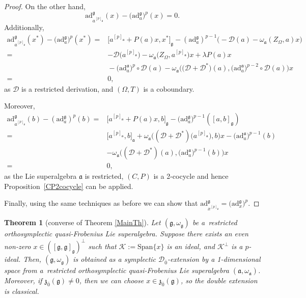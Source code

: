 \documentclass[pdftex]{sigma}
\numberwithin{equation}{section}
\newtheorem{Theorem}{Theorem}[section]
\begin{document}
\begin{proof}
On the other hand,
\[
\mathrm{ad}_{a^{[p]_\mathfrak{g}}}^\mathfrak{g}(x)-\big(\mathrm{ad}_{a}^\mathfrak{g}\big)^p(x) = 0.
\]
Additionally,
\begin{align*}
\mathrm{ad}_{a^{[p]_\mathfrak{g}}}^\mathfrak{g}(x^*)-\bigl(\mathrm{ad}_{a}^\mathfrak{g}\bigr)^p(x^*) ={}& \big[a^{[p]_\mathfrak{a}}+P(a)x, x^*\big]_\mathfrak{g}-(\mathrm{ad}_{a}^\mathfrak{g})^{p-1}\bigl(-\mathscr{D}(a)-\omega_\mathfrak{a}(Z_\Omega,a)x\bigr)\\
={}& -{\mathscr D}\bigl(a^{[p]_\mathfrak{a}}\bigr)-\omega_\mathfrak{a}\bigl(Z_\Omega, a^{[p]_\mathfrak{a}}\bigr)x+\lambda P(a)x\\
&{}-\bigl(\mathrm{ad}_a^\mathfrak{a}\bigr)^p\circ {\mathscr D}(a)-\omega_\mathfrak{a}\bigl(\bigl({\mathscr D}+{\mathscr D}^*\bigr)(a), \bigl(\mathrm{ad}_a^\mathfrak{a}\bigr)^{p-2}\circ {\mathscr D}(a)\bigr)x\\
={}&0,
\end{align*}
as ${\mathscr D}$ is a restricted derivation, and $(\Omega, T)$ is a coboundary.

Moreover,
\begin{align*}
\mathrm{ad}_{a^{[p]_\mathfrak{g}}}^\mathfrak{g}(b)-(\mathrm{ad}_{a}^\mathfrak{g})^p(b) ={}& \big[a^{[p]_\mathfrak{a}}+P(a)x,b\big]_\mathfrak{g}-\bigl(\mathrm{ad}_a^\mathfrak{g}\bigr)^{p-1}([a,b]_\mathfrak{g})\\
={}& \big[a^{[p]_\mathfrak{a}},b\big]_\mathfrak{a}+\omega_\mathfrak{a}\bigl(({\mathscr D}+{\mathscr D}^*)\bigl(a^{[p]_\mathfrak{a}}\bigr), b\bigr)x- \bigl(\mathrm{ad}_a^\mathfrak{a}\bigr)^{p-1}(b)\\
&-\omega_\mathfrak{a}\bigl(({\mathscr D}+{\mathscr D}^*)(a), \bigl(\mathrm{ad}_a^\mathfrak{a}\bigr)^{p-1}(b)\bigr)x\\
={}&0,
\end{align*}
as the Lie superalgebra $\mathfrak{a}$ is restricted, $(C,P)$ is a 2-cocycle and hence Proposition~\ref{CP2cocycle} can be applied.

Finally, using the same techniques as before we can show that $\mathrm{ad}_{x^{[p]_\mathfrak{g}}}^\mathfrak{g}=\big(\mathrm{ad}_x^\mathfrak{g}\big)^p$.
\end{proof}
\begin{Theorem}[converse of Theorem \ref{MainTh}]
\label{Rec1}
Let $(\mathfrak{g},\omega_\mathfrak{g})$ be a~restricted orthosymplectic quasi-Frobenius Lie superalgebra. Suppose there exists an even non-zero $x\in ([\mathfrak{g}, \mathfrak{g}]_\mathfrak{g})^\perp$ such that $\mathscr{K}:=\mathrm{Span}\{x\}$ is an ideal, and $\mathscr{K}^\perp$ is a $p$-ideal. Then, $(\mathfrak{g},\omega_\mathfrak{g})$ is obtained as a symplectic ${\mathscr D}_{\bar 0}$-extension by a 1-dimensional space from a~restricted orthosymplectic quasi-Frobenius Lie superalgebra $(\mathfrak{a},\omega_\mathfrak{a})$. Moreover, if $\mathfrak{z}_{\bar 0}(\mathfrak{g})\not =0$, then we can choose $x \in \mathfrak{z}_{\bar 0}(\mathfrak{g})$, so the double extension is classical.

\end{Theorem}
\end{document}
